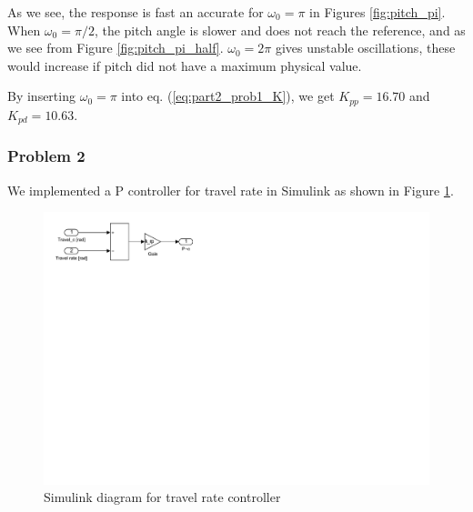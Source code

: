 As we see, the response is fast an accurate for $\omega_0 = \pi$ in Figures \ref{fig:pitch_pi}. When $\omega_0 = \pi/2$, the pitch angle is slower and does not reach the reference, and as we see from Figure \ref{fig:pitch_pi_half}. $\omega_0 = 2 \pi$ gives unstable oscillations, these would increase if pitch did not have a maximum physical value.
\medskip

By inserting $\omega_0 = \pi$ into eq. (\ref{eq:part2_prob1_K}), we get $K_{pp} = 16.70$ and $K_{pd} = 10.63$.




\subsubsection{Problem 2}
We implemented a P controller for travel rate in Simulink as shown in Figure \ref{fig:simulink_travel}.
\begin{figure}[htb]
	\centering
	\includegraphics[trim={0 16cm 16cm 0}, clip,width=\linewidth]{images/simulink/P2_travel.pdf}
	\caption{Simulink diagram for travel rate controller}
    \label{fig:simulink_travel}
\end{figure}


